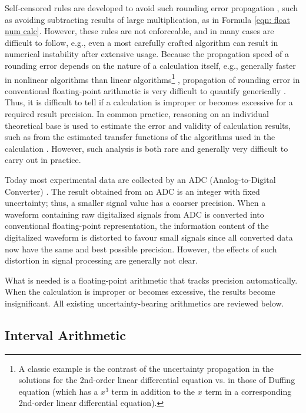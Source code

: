 \documentclass[twoside]{article}
\numberwithin{equation}{section}
\begin{document}
Self-censored rules are developed to avoid such rounding error propagation \cite{Numerical_Recipes}\cite{Precise_Numerical_Methods}, such as avoiding subtracting results of large multiplication, as in Formula \eqref{eqn: float num calc}.  
However, these rules are not enforceable, and in many cases are difficult to follow, e.g., even a most carefully crafted algorithm can result in numerical instability after extensive usage.  
Because the propagation speed of a rounding error depends on the nature of a calculation itself, e.g., generally faster in nonlinear algorithms than linear algorithms\footnote{A classic example is the contrast of the uncertainty propagation in the solutions for the 2nd-order linear differential equation vs. in those of Duffing equation (which has a $x^3$ term in addition to the $x$ term in a corresponding 2nd-order linear differential equation).} \cite{Chaotic_Dynamics}, propagation of rounding error in conventional floating-point arithmetic is very difficult to quantify generically \cite{Stochastic_Arithmetic}.  
Thus, it is difficult to tell if a calculation is improper or becomes excessive for a required result precision.  
In common practice, reasoning on an individual theoretical base is used to estimate the error and validity of calculation results, such as from the estimated transfer functions of the algorithms used in the calculation \cite{Numerical_Recipes}\cite{Error_Analysi_Digital_Filters}\cite{Floating-point_Digital_Filters}.  
However, such analysis is both rare and generally very difficult to carry out in practice.  

Today most experimental data are collected by an ADC (Analog-to-Digital Converter) \cite{Electronics}.  
The result obtained from an ADC is an integer with fixed uncertainty; thus, a smaller signal value has a coarser precision.  
When a waveform containing raw digitalized signals from ADC is converted into conventional floating-point representation, the information content of the digitalized waveform is distorted to favour small signals since all converted data now have the same and best possible precision.  
However, the effects of such distortion in signal processing are generally not clear.

What is needed is a floating-point arithmetic that tracks precision automatically.  When the calculation is improper or becomes excessive, the results become insignificant.  
All existing uncertainty-bearing arithmetics are reviewed below. 


\subsection{Interval Arithmetic}
\end{document}
